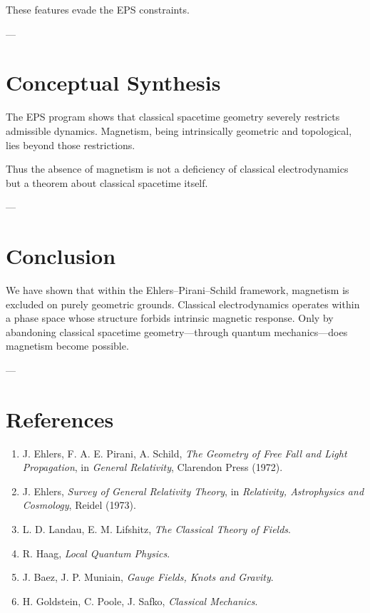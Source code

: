 \documentclass[11pt]{article}
\begin{document}
These features evade the EPS constraints.

---

\section{Conceptual Synthesis}

The EPS program shows that classical spacetime geometry severely restricts admissible dynamics. Magnetism, being intrinsically geometric and topological, lies beyond those restrictions.

Thus the absence of magnetism is not a deficiency of classical electrodynamics but a theorem about classical spacetime itself.

---

\section{Conclusion}

We have shown that within the Ehlers–Pirani–Schild framework, magnetism is excluded on purely geometric grounds. Classical electrodynamics operates within a phase space whose structure forbids intrinsic magnetic response. Only by abandoning classical spacetime geometry—through quantum mechanics—does magnetism become possible.

---

\section*{References}

\begin{enumerate}
\item J. Ehlers, F. A. E. Pirani, A. Schild, \emph{The Geometry of Free Fall and Light Propagation}, in \emph{General Relativity}, Clarendon Press (1972).
\item J. Ehlers, \emph{Survey of General Relativity Theory}, in \emph{Relativity, Astrophysics and Cosmology}, Reidel (1973).
\item L. D. Landau, E. M. Lifshitz, \emph{The Classical Theory of Fields}.
\item R. Haag, \emph{Local Quantum Physics}.
\item J. Baez, J. P. Muniain, \emph{Gauge Fields, Knots and Gravity}.
\item H. Goldstein, C. Poole, J. Safko, \emph{Classical Mechanics}.
\end{enumerate}
\end{document}
